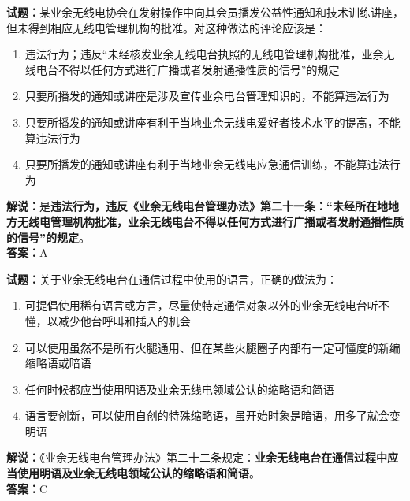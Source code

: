 \documentclass{ctexbook}
\begin{document}
\bigskip




\noindent\textbf{试题：}某业余无线电协会在发射操作中向其会员播发公益性通知和技术训练讲座，但未得到相应无线电管理机构的批准。对这种做法的评论应该是：
\begin{enumerate}[leftmargin=3em]
\item 违法行为；违反“未经核发业余无线电台执照的无线电管理机构批准，业余无线电台不得以任何方式进行广播或者发射通播性质的信号”的规定
\item 只要所播发的通知或讲座是涉及宣传业余电台管理知识的，不能算违法行为
\item 只要所播发的通知或讲座有利于当地业余无线电爱好者技术水平的提高，不能算违法行为
\item 只要所播发的通知或讲座有利于当地业余无线电应急通信训练，不能算违法行为
\end{enumerate}
\noindent\textbf{解说：}是\textbf{违法行为，违反《业余无线电台管理办法》第二十一条：“未经所在地地方无线电管理机构批准，业余无线电台不得以任何方式进行广播或者发射通播性质的信号”的规定}。\\\noindent\textbf{答案：}A

\bigskip




\noindent\textbf{试题：}关于业余无线电台在通信过程中使用的语言，正确的做法为：
\begin{enumerate}[leftmargin=3em]
\item 可提倡使用稀有语言或方言，尽量使特定通信对象以外的业余无线电台听不懂，以减少他台呼叫和插入的机会
\item 可以使用虽然不是所有火腿通用、但在某些火腿圈子内部有一定可懂度的新编缩略语或暗语
\item 任何时候都应当使用明语及业余无线电领域公认的缩略语和简语
\item 语言要创新，可以使用自创的特殊缩略语，虽开始时象是暗语，用多了就会变明语
\end{enumerate}
\noindent\textbf{解说：}《业余无线电台管理办法》第二十二条规定：\textbf{业余无线电台在通信过程中应当使用明语及业余无线电领域公认的缩略语和简语}。\\\noindent\textbf{答案：}C

\bigskip
\end{document}
